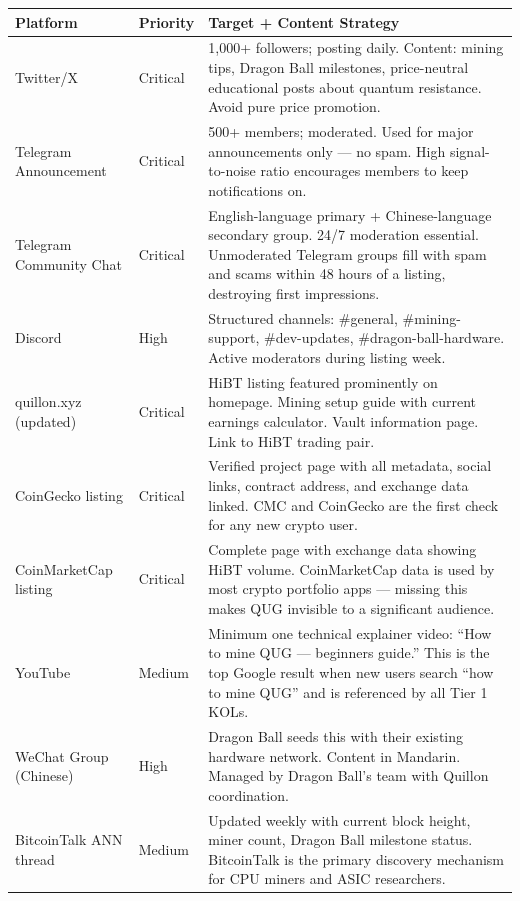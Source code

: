 \documentclass[11pt,a4paper]{article}
\begin{document}
\begin{center}
\begin{tabular}{L{4.5cm} C{2cm} L{6.5cm}}
  \toprule
  \textbf{Platform} & \textbf{Priority} & \textbf{Target + Content Strategy} \\
  \midrule
  Twitter/X & Critical & 1,000+ followers; posting daily. Content: mining tips, Dragon Ball milestones, price-neutral educational posts about quantum resistance. Avoid pure price promotion. \\
  Telegram Announcement & Critical & 500+ members; moderated. Used for major announcements only — no spam. High signal-to-noise ratio encourages members to keep notifications on. \\
  Telegram Community Chat & Critical & English-language primary + Chinese-language secondary group. 24/7 moderation essential. Unmoderated Telegram groups fill with spam and scams within 48 hours of a listing, destroying first impressions. \\
  Discord & High & Structured channels: \#general, \#mining-support, \#dev-updates, \#dragon-ball-hardware. Active moderators during listing week. \\
  quillon.xyz (updated) & Critical & HiBT listing featured prominently on homepage. Mining setup guide with current earnings calculator. Vault information page. Link to HiBT trading pair. \\
  CoinGecko listing & Critical & Verified project page with all metadata, social links, contract address, and exchange data linked. CMC and CoinGecko are the first check for any new crypto user. \\
  CoinMarketCap listing & Critical & Complete page with exchange data showing HiBT volume. CoinMarketCap data is used by most crypto portfolio apps — missing this makes QUG invisible to a significant audience. \\
  YouTube & Medium & Minimum one technical explainer video: ``How to mine QUG — beginners guide.'' This is the top Google result when new users search ``how to mine QUG'' and is referenced by all Tier 1 KOLs. \\
  WeChat Group (Chinese) & High & Dragon Ball seeds this with their existing hardware network. Content in Mandarin. Managed by Dragon Ball's team with Quillon coordination. \\
  BitcoinTalk ANN thread & Medium & Updated weekly with current block height, miner count, Dragon Ball milestone status. BitcoinTalk is the primary discovery mechanism for CPU miners and ASIC researchers. \\
  \bottomrule
\end{tabular}
\end{center}
\end{document}
